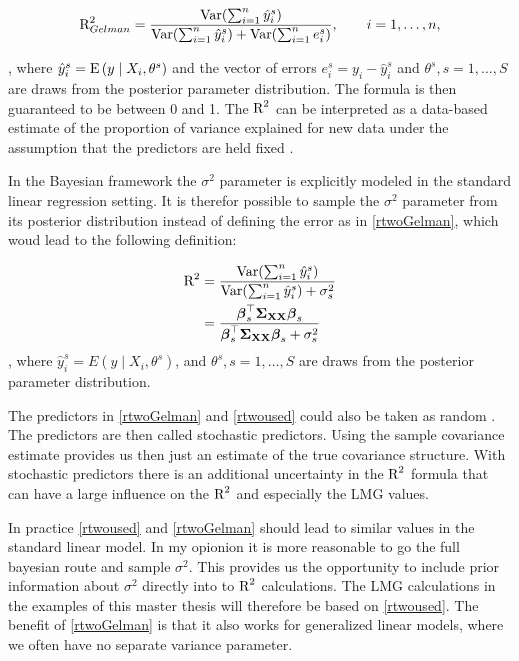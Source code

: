 \documentclass[11pt,a4paper,twoside]{book}\usepackage[]{graphicx}\usepackage[]{color}
\begin{document}
      \begin{align} 
       \text{R}^2_{Gelman} = \frac{\operatorname{Var}(\sum_{i=1}^{n}\hat{y}^s_{i})}{\operatorname{Var}(\sum_{i=1}^{n}\hat{y}^s_{i})+\operatorname{Var}(\sum_{i=1}^{n}e^s_{i})}, \qquad i = 1,\dots,n, \label{rtwoGelman} 
   \end{align} 
   
, where $\hat{y}^s_{i}  = \operatorname{E} \left({y \mid X_{i}, \theta^s}\right) $ and the vector of errors $e^s_{i} = y_{i} - \hat{y}^s_{i}$ and $\theta^s, s = 1,\dotsc, S$ are draws from the posterior parameter distribution. The formula is then guaranteed to be between 0 and 1. The $\text{R}^2$ can  be interpreted as a data-based estimate of the proportion of variance explained for new data under the assumption that the predictors are held fixed \citep{Gelman2017}.

In the Bayesian framework the $\sigma^2$ parameter is explicitly modeled in the standard linear regression setting. It is therefor possible to sample the $\sigma^2$ parameter from its posterior distribution instead of defining the error as in \eqref{rtwoGelman}, which woud lead to the following definition:

    \begin{align} 
        \text{R}^2 &= \frac{\operatorname{Var}(\sum_{i=1}^{n}\hat{y}^s_{i})}{\operatorname{Var}(\sum_{i=1}^{n}\hat{y}^s_{i})+\sigma_{s}^2} \\ &= \frac{{\boldsymbol{\beta}}_{s}^\top {\boldsymbol{\Sigma}}{}_{{\mathbf{X}} {\mathbf{X}}}  {\boldsymbol{\beta}}_{s}}{{\boldsymbol{\beta}}_{s}^\top {\boldsymbol{\Sigma}}{}_{{\mathbf{X}} {\mathbf{X}}}  {\boldsymbol{\beta}}_{s}+\sigma_{s}^2}\label{rtwoused} 
   \end{align} 
 , where $\hat{y}^s_{i}  = E \left({y \mid X_{i}, \theta^s}\right) $,  and $\theta^s, s = 1,\dotsc, S$ are draws from the posterior parameter distribution.


The predictors in \eqref{rtwoGelman} and \eqref{rtwoused} could also be taken as random \citep{Gelman2017}. The predictors are then called stochastic predictors. Using the sample covariance estimate provides us then just an estimate of the true covariance structure. With stochastic predictors there is an additional uncertainty in the $\text{R}^2$ formula that can have a large influence on the $\text{R}^2$ and especially the LMG values.

In practice \eqref{rtwoused} and \eqref{rtwoGelman} should lead to  similar values in the standard linear model. In my opionion it is more reasonable to go the full bayesian route and sample  $\sigma^2$. This provides us the opportunity to include prior information about $\sigma^2$ directly into to $\text{R}^2$ calculations. The LMG calculations in the examples of this master thesis will therefore be based on \eqref{rtwoused}.  The benefit of \eqref{rtwoGelman} is that it also works for generalized linear models, where we often have no separate variance parameter.
\end{document}
